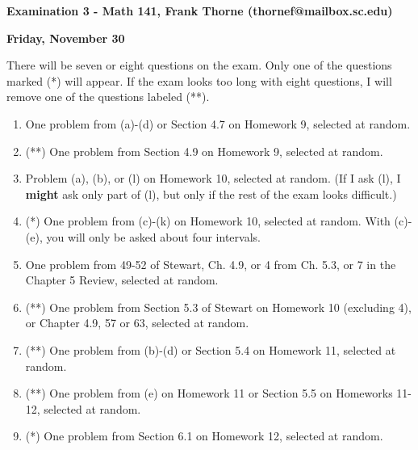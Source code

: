 \documentclass[12pt]{article}
\begin{document}
\setlength{\topmargin}{-2mm}





\begin{center}{\bf Examination 3 - Math 141, Frank Thorne (thornef@mailbox.sc.edu)}
\end{center}
\begin{center}
{\bf Friday, November 30}
\end{center}

There will be seven or eight questions on the exam. Only one of the questions
marked (*) will appear. If the exam looks too long with eight questions, I will
remove one of the questions labeled (**).

\begin{enumerate}[(1)]
\item
One problem from (a)-(d) or Section 4.7 on Homework 9, selected at random.

\item
(**) One problem from Section 4.9 on Homework 9, selected at random.

\item
Problem (a), (b), or (l) on Homework 10, selected at random.
(If I ask (l), I {\bf might} ask only part of (l), but only if the
rest of the exam looks difficult.)

\item
(*) One problem from (c)-(k) on Homework 10, selected at random. With (c)-(e),
you will only be asked about four intervals.

\item
One problem from 49-52 of Stewart, Ch. 4.9, or 4 from Ch. 5.3, or
7 in the Chapter 5 Review, selected at random.

\item
(**) One problem from Section 5.3 of Stewart on Homework 10 (excluding 4), 
or Chapter 4.9, 57 or 63,
selected at random.

\item
(**) One problem from (b)-(d) or Section 5.4 on Homework 11, selected at random.

\item
(**) One problem from (e) on Homework 11 or Section 5.5 on Homeworks 11-12, selected at random.

\item (*)
One problem from Section 6.1 on Homework 12, selected at random.


\end{enumerate}
\end{document}

